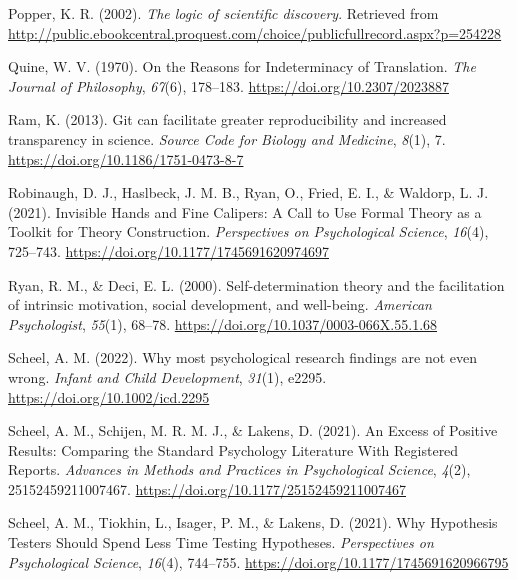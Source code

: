 \documentclass[
  man, noextraspace,floatsintext]{apa6}
\newlength{\cslhangindent}
\newenvironment{CSLReferences}[2] %
 {\begin{list}{}{%
  \setlength{\itemindent}{0pt}
  \setlength{\leftmargin}{0pt}
  \setlength{\parsep}{0pt}
  \ifodd #1
   \setlength{\leftmargin}{\cslhangindent}
   \setlength{\itemindent}{-1\cslhangindent}
  \fi
  \setlength{\itemsep}{#2\baselineskip}}}
 {\end{list}}
\begin{document}
\begin{CSLReferences}{1}{0}
Popper, K. R. (2002). \emph{The logic of scientific discovery}. Retrieved from \url{http://public.ebookcentral.proquest.com/choice/publicfullrecord.aspx?p=254228}

Quine, W. V. (1970). On the {Reasons} for {Indeterminacy} of {Translation}. \emph{The Journal of Philosophy}, \emph{67}(6), 178--183. \url{https://doi.org/10.2307/2023887}

Ram, K. (2013). Git can facilitate greater reproducibility and increased transparency in science. \emph{Source Code for Biology and Medicine}, \emph{8}(1), 7. \url{https://doi.org/10.1186/1751-0473-8-7}

Robinaugh, D. J., Haslbeck, J. M. B., Ryan, O., Fried, E. I., \& Waldorp, L. J. (2021). Invisible {Hands} and {Fine Calipers}: {A Call} to {Use Formal Theory} as a {Toolkit} for {Theory Construction}. \emph{Perspectives on Psychological Science}, \emph{16}(4), 725--743. \url{https://doi.org/10.1177/1745691620974697}

Ryan, R. M., \& Deci, E. L. (2000). Self-determination theory and the facilitation of intrinsic motivation, social development, and well-being. \emph{American Psychologist}, \emph{55}(1), 68--78. \url{https://doi.org/10.1037/0003-066X.55.1.68}

Scheel, A. M. (2022). Why most psychological research findings are not even wrong. \emph{Infant and Child Development}, \emph{31}(1), e2295. \url{https://doi.org/10.1002/icd.2295}

Scheel, A. M., Schijen, M. R. M. J., \& Lakens, D. (2021). An {Excess} of {Positive Results}: {Comparing} the {Standard Psychology Literature With Registered Reports}. \emph{Advances in Methods and Practices in Psychological Science}, \emph{4}(2), 25152459211007467. \url{https://doi.org/10.1177/25152459211007467}

Scheel, A. M., Tiokhin, L., Isager, P. M., \& Lakens, D. (2021). Why {Hypothesis Testers Should Spend Less Time Testing Hypotheses}. \emph{Perspectives on Psychological Science}, \emph{16}(4), 744--755. \url{https://doi.org/10.1177/1745691620966795}


\end{CSLReferences}
\end{document}
